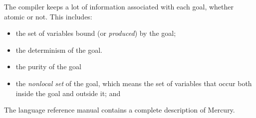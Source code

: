 The compiler keeps a lot of information associated with each goal,
whether atomic or not.
This includes:

\begin{itemize}
\item
the set of variables bound (or \emph{produced}) by the goal;
\item
the determinism of the goal.
\item
the purity of the goal
\item
the \emph{nonlocal set} of the goal,
which means the set of variables
that occur both inside the goal and outside it; and
\end{itemize}

\noindent
The language reference manual \citep{mercury_refman} contains a complete
description of Mercury.

